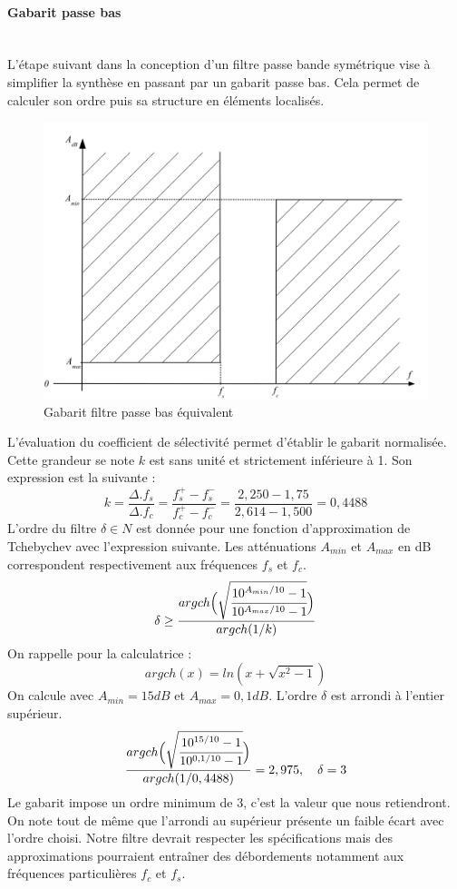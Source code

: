 \documentclass[french]{article}
\begin{document}
\paragraph{Gabarit passe bas} ~~\\ \noindent
L'étape suivant dans la conception d'un filtre passe bande symétrique vise à simplifier la synthèse en passant par un gabarit passe bas. Cela permet de calculer son ordre puis sa structure en éléments localisés.
\begin{figure}[H]
	\centering
	\includegraphics[width=0.5\linewidth]{ressources/gabarit_passe_bas}
	\caption{Gabarit filtre passe bas équivalent}
	\label{fig:gabaritpassepas}
\end{figure}
L'évaluation du coefficient de sélectivité permet d'établir le gabarit normalisée. Cette grandeur se note $k$ est sans unité et strictement inférieure à 1. Son expression est la suivante :
\begin{equation}
	k=\frac{\Delta.f_s}{\Delta.f_c}=\frac{f_s^+-f_s^-}{f_c^+-f_c^-}=\frac{2,250-1,75}{2,614-1,500}=0,4488
\end{equation}
L'ordre du filtre $\delta \in N$ est donnée pour une fonction d'approximation de Tchebychev avec l'expression suivante. Les atténuations $A_{min}$ et $A_{max}$ en dB correspondent respectivement aux fréquences $f_s$ et $f_c$.
\begin{equation}
\delta \geq \frac{argch
	\Big( \sqrt{\cfrac{10^{A_{min}/10}-1}{10^{A_{max}/10}-1}}
	\Big)
}{argch(1/k)}
\end{equation}
On rappelle pour la calculatrice :
\begin{equation}
argch(x)=ln(x+\sqrt{x^2-1})
\end{equation}
On calcule avec $A_{min} = 15dB$ et $A_{max} = 0,1dB$. L'ordre $\delta$ est arrondi à l'entier supérieur.
\begin{equation}
\frac{argch
	\Big( \sqrt{\cfrac{10^{15/10}-1}{10^{0,1/10}-1}}
	\Big)
}{argch(1/0,4488)} = 2,975, \quad \delta = 3
\end{equation}
Le gabarit impose un ordre minimum de 3, c'est la valeur que nous retiendront. On note tout de même que l'arrondi au supérieur présente un faible écart avec l'ordre choisi. Notre filtre devrait respecter les spécifications mais des approximations pourraient entraîner des débordements notamment aux fréquences particulières $f_c$ et $f_s$.
\end{document}
